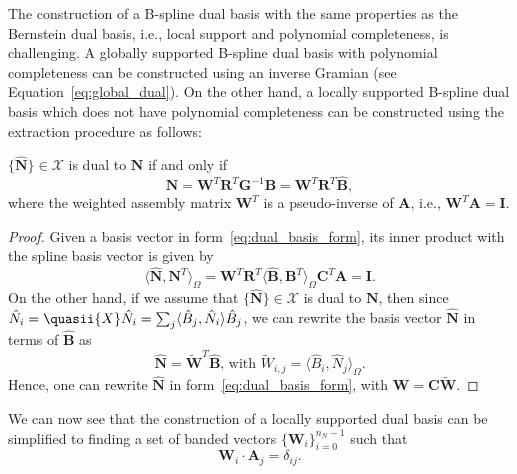 The construction of a B-spline dual basis with the same properties as the Bernstein dual basis, i.e., local support and polynomial completeness, is challenging. A globally supported B-spline dual basis with polynomial completeness can be constructed using an inverse Gramian (see Equation~\eqref{eq:global_dual}). On the other hand, a locally supported B-spline dual basis which does not have polynomial completeness can be constructed using the \Bezier extraction procedure as follows:
\begin{lemma}
	$\{\hat{\mathbf{N}}\}\in\mathcal{X}$ is dual to ${\mathbf{N}}$ if and only if
	\begin{equation}
		\hat{\mathbf{N}} = \mathbf{W}^T\mathbf{R}^T\mathbf{G}^{-1}\mathbf{B}=\mathbf{W}^T\mathbf{R}^T\hat{\mathbf{B}},\label{eq:dual_basis_form}
	\end{equation}
	where the weighted assembly matrix $\mathbf{W}^T$ is a pseudo-inverse of $\mathbf{A}$, i.e., $\mathbf{W}^T\mathbf{A} = \mathbf{I}$.
\end{lemma}
\begin{proof}
	Given a basis vector in form~\eqref{eq:dual_basis_form}, its inner product with the spline basis vector is given by
	\begin{equation}
		\langle\hat{\mathbf{N}},\mathbf{N}^T\rangle_\Omega = \mathbf{W}^T\mathbf{R}^T\langle\hat{\mathbf{B}},\mathbf{B}^T\rangle_\Omega\mathbf{C}^T\mathbf{A}=\mathbf{I}.
	\end{equation}
	On the other hand, if we assume that $\{\hat{\mathbf{N}}\}\in\mathcal{X}$ is dual to ${\mathbf{N}}$, then since $\hat{N}_i=\quasii{X}\hat{N}_i=\sum_j\langle \hat{B}_j, \hat{N}_i\rangle \hat{B}_j$, we can rewrite the basis vector $\hat{\mathbf{N}}$ in terms of $\hat{\mathbf{B}}$ as
	\begin{equation}
		\hat{\mathbf{N}} = \tilde{\mathbf{W}}^T\hat{\mathbf{B}}\text{, with } \tilde{W}_{i,j} = \langle{\hat{B}_i,\hat{N}_j}\rangle_\Omega.
	\end{equation}
	Hence, one can rewrite $\hat{\mathbf{N}}$ in form~\eqref{eq:dual_basis_form}, with $\mathbf{W}=\mathbf{C}\tilde{\mathbf{W}}$.
\end{proof}
We can now see that the construction of a locally supported dual basis can be simplified to finding a set of banded vectors $\{\mathbf{W}_i\}_{i=0}^{n_N-1}$ such that
\begin{equation}
	\mathbf{W}_i\cdot\mathbf{A}_j=\delta_{ij}.\label{eq:biorthonormal}
\end{equation}

